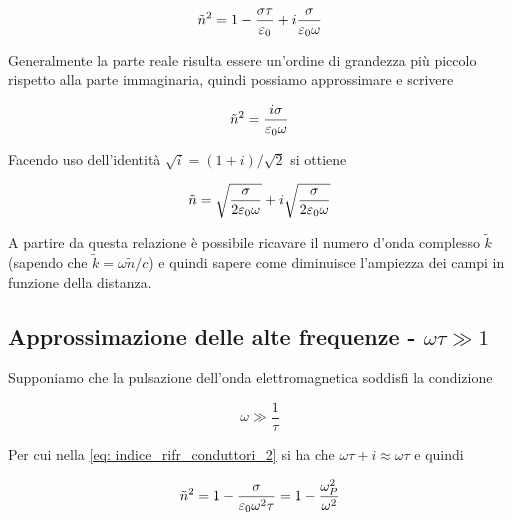 \begin{tcolorbox}[colback=yellow!10!white, colframe=orange!70!black, boxrule=0.8pt]
\begin{equation}
    \tilde{n}^2 = 1 - \frac{\sigma \tau}{\varepsilon_0} + i \frac{\sigma}{\varepsilon_0 \omega}
\end{equation}
\end{tcolorbox}

Generalmente la parte reale risulta essere un'ordine di grandezza più piccolo rispetto alla parte immaginaria, quindi possiamo approssimare e scrivere 

\begin{equation}
    \tilde{n}^2 = \frac{i\sigma}{\varepsilon_0 \omega}
\end{equation}

Facendo uso dell'identità $\sqrt{i} = (1 + i)/\sqrt{2}$ si ottiene 

\begin{tcolorbox}[colback=yellow!10!white, colframe=orange!70!black, boxrule=0.8pt]
\begin{equation}
    \tilde{n} = \sqrt{\frac{\sigma}{2 \varepsilon_0 \omega}} + i \sqrt{\frac{\sigma}{2 \varepsilon_0 \omega}}
\end{equation}
\end{tcolorbox}

A partire da questa relazione è possibile ricavare il numero d'onda complesso $\tilde{k}$ (sapendo che $\tilde{k} = \omega \tilde{n}/c$) e quindi sapere come diminuisce l'ampiezza dei campi in funzione della distanza.  

\newpage

\subsection{Approssimazione delle alte frequenze - $\omega \tau \gg 1$}

Supponiamo che la pulsazione dell'onda elettromagnetica soddisfi la condizione

\begin{tcolorbox}[colback=yellow!10!white, colframe=orange!70!black, boxrule=0.8pt]
\begin{equation}
    \omega \gg \frac{1}{\tau}
\end{equation}
\end{tcolorbox}

Per cui nella \eqref{eq: indice_rifr_conduttori_2} si ha che $\omega \tau + i \approx \omega \tau$ e quindi 

\begin{tcolorbox}[colback=yellow!10!white, colframe=orange!70!black, boxrule=0.8pt]
\begin{equation}
    \tilde{n}^2 = 1 - \frac{\sigma}{\varepsilon_0 \omega^2 \tau} = 1 - \frac{\omega_P ^2}{\omega^2}
\end{equation}
\end{tcolorbox}

